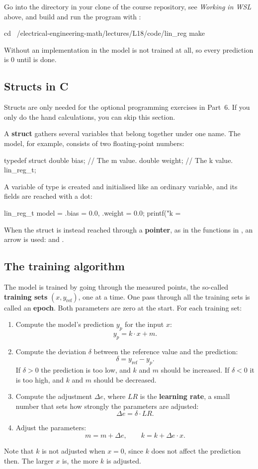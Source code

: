 Go into the directory in your clone of the course repository, see \emph{Working in WSL} above,
and build and run the program with :
\begin{shell}
cd ~/electrical-engineering-math/lectures/L18/code/lin_reg
make
\end{shell}
Without an implementation in  the model is not trained at all, so every
prediction is $0$ until  is done.

\subsection*{Structs in C}
Structs are only needed for the optional programming exercises in Part~6. If you only do the
hand calculations, you can skip this section.

A \textbf{struct} gathers several
variables that belong together under one name. The model, for example, consists of two
floating-point numbers:
\begin{ccode}
typedef struct
{
    double bias;   // The m value.
    double weight; // The k value.
} lin_reg_t;
\end{ccode}
A variable of type  is created and initialised like an ordinary variable, and its
fields are reached with a dot:
\begin{ccode}
lin_reg_t model = {.bias = 0.0, .weight = 0.0};
printf("k = %
\end{ccode}
When the struct is instead reached through a \textbf{pointer}, as in the functions in
, an arrow is used:  and .

\subsection*{The training algorithm}
The model is trained by going through the measured points, the so-called \textbf{training sets}
$(x, y_{\text{ref}})$, one at a time. One pass through all the training sets is called an
\textbf{epoch}. Both parameters are zero at the start. For each training set:
\begin{enumerate}
  \item Compute the model's prediction $y_p$ for the input $x$:
    \[
      y_p = k \cdot x + m.
    \]
  \item Compute the deviation $\delta$ between the reference value and the prediction:
    \[
      \delta = y_{\text{ref}} - y_p.
    \]
    If $\delta > 0$ the prediction is too low, and $k$ and $m$ should be increased. If
    $\delta < 0$ it is too high, and $k$ and $m$ should be decreased.
  \item Compute the adjustment $\Delta e$, where $\mathit{LR}$ is the \textbf{learning rate}, a
    small number that sets how strongly the parameters are adjusted:
    \[
      \Delta e = \delta \cdot \mathit{LR}.
    \]
  \item Adjust the parameters:
    \[
      m = m + \Delta e, \qquad k = k + \Delta e \cdot x.
    \]
\end{enumerate}
Note that $k$ is not adjusted when $x = 0$, since $k$ does not affect the prediction then. The
larger $x$ is, the more $k$ is adjusted.

